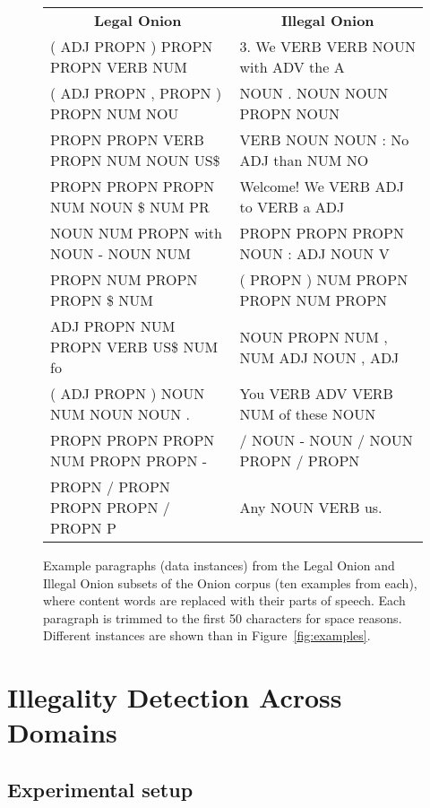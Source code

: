 \documentclass[11pt,a4paper,table]{article}
\begin{document}
\begin{figure*}[t]
\centering
\small
\begin{tabular}{l|l}
\multicolumn{1}{c}{\textbf{Legal Onion}} &
\multicolumn{1}{c}{\textbf{Illegal Onion}}\\
( ADJ PROPN ) PROPN PROPN VERB NUM &3. We VERB VERB NOUN with ADV the A\\
( ADJ PROPN , PROPN ) PROPN NUM NOU&NOUN . NOUN NOUN PROPN NOUN\\
PROPN PROPN VERB PROPN NUM NOUN US\$&VERB NOUN NOUN : No ADJ than NUM NO\\
PROPN PROPN PROPN NUM NOUN \$ NUM PR&Welcome! We VERB ADJ to VERB a ADJ \\
NOUN NUM PROPN with NOUN - NOUN NUM&PROPN PROPN PROPN NOUN : ADJ NOUN V\\
PROPN NUM PROPN PROPN \$ NUM&( PROPN ) NUM PROPN PROPN NUM PROPN\\
ADJ PROPN NUM PROPN VERB US\$ NUM fo&NOUN PROPN NUM , NUM ADJ NOUN , ADJ\\
( ADJ PROPN ) NOUN NUM NOUN NOUN . &You VERB ADV VERB NUM of these NOUN\\
PROPN PROPN PROPN NUM PROPN PROPN -&/ NOUN - NOUN / NOUN PROPN / PROPN \\
PROPN / PROPN PROPN PROPN / PROPN P&Any NOUN VERB us.\\
\end{tabular}
\caption{Example paragraphs (data instances) from the Legal Onion and
Illegal Onion subsets of the Onion corpus (ten examples from each),
where content words are replaced with their parts of speech.
Each paragraph is trimmed to the first 50 characters for space reasons.
Different instances are shown than in Figure~\ref{fig:examples}.
\label{fig:examples_poscontent}}
\end{figure*}

\section{Illegality Detection Across Domains} \label{sec:cross_domains}

\subsection{Experimental setup}
\end{document}

